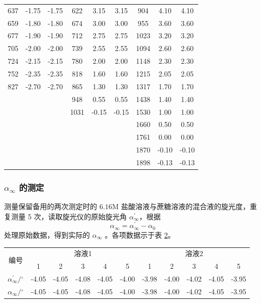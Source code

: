\begin{table}[H]
\begin{tabular}{ccc|ccc|ccc}
        637 & -1.75 & -1.75 & 622 & 3.15 & 3.15 & 904 & 4.10 & 4.10 \\
        659 & -1.80 & -1.80 & 674 & 3.00 & 3.00 & 955 & 3.60 & 3.60 \\
        677 & -1.90 & -1.90 & 712 & 2.75 & 2.75 & 1023 & 3.20 & 3.20 \\
        705 & -2.00 & -2.00 & 739 & 2.55 & 2.55 & 1094 & 2.60 & 2.60 \\
        724 & -2.15 & -2.15 & 780 & 2.00 & 2.00 & 1148 & 2.30 & 2.30 \\
        752 & -2.35 & -2.35 & 818 & 1.60 & 1.60 & 1215 & 2.05 & 2.05 \\
        827 & -2.70 & -2.70 & 865 & 1.30 & 1.30 & 1317 & 1.70 & 1.70 \\
        \multicolumn{3}{c|}{\multirow{7}{*}{}} & 948 & 0.55 & 0.55 & 1438 & 1.40 & 1.40 \\
        \multicolumn{3}{c|}{} & 1031 & -0.15 & -0.15 & 1530 & 1.00 & 1.00 \\
        \multicolumn{3}{c|}{} & \multicolumn{3}{c|}{\multirow{5}{*}{}} & 1660 & 0.50 & 0.50 \\
        \multicolumn{3}{c|}{} & \multicolumn{3}{c|}{} & 1761 & 0.00 & 0.00 \\
        \multicolumn{3}{c|}{} & \multicolumn{3}{c|}{} & 1870 & -0.10 & -0.10 \\
        \multicolumn{3}{c|}{} & \multicolumn{3}{c|}{} & 1898 & -0.13 & -0.13 \\
        \bottomrule
    \end{tabular}
    \label{tab:2}
\end{table}

\subsubsection{$\alpha_{\infty}$ 的测定}

测量保留备用的两次测定时的 $6.16 \mathrm{M}$ 盐酸溶液与蔗糖溶液的混合液的旋光度，重复测量 5 次，读取旋光仪的原始旋光角 $\alpha_{\infty}^{\prime}$，根据
\begin{equation}\label{eq:1}
    \alpha_{\infty}=\alpha_{\infty}^{\prime}-\alpha_0
\end{equation}
处理原始数据，得到实际的 $\alpha_{\infty}$ 。各项数据示于表 \ref{tab:3}。

\begin{table}[htbp]
\centering
{}
\begin{tabular}{c|ccccc|ccccc}
\toprule
\multirow{2}{*}{编号} & \multicolumn{5}{c|}{溶液1} & \multicolumn{5}{c}{溶液2} \\
 & 1 & 2 & 3 & 4 & 5 & 1 & 2 & 3 & 4 & 5 \\
\midrule
$\alpha_{\infty}^{\prime} /{ }^{\circ}$ & -4.05 & -4.05 & -4.08 & -4.05 & -4.00 & -3.98 & -4.00 & -4.02 & -4.05 & -3.95 \\
$\alpha_{\infty} /{ }^{\circ}$ & -4.05 & -4.05 & -4.08 & -4.05 & -4.00 & -3.98 & -4.00 & -4.02 & -4.05 & -3.95 \\
\bottomrule
\end{tabular}
\label{tab:3}
\end{table}

